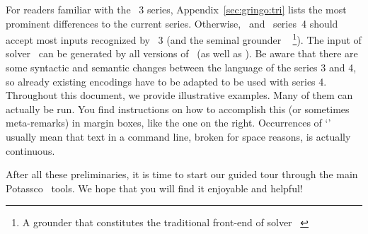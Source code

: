 For readers familiar with the \gringo~3 series, Appendix~\ref{sec:gringo:tri}
lists the most prominent differences to the current series.
Otherwise, \gringo\ and \clingo\ series~4 should accept most inputs recognized by \gringo~3 (and the seminal grounder \lparse~\cite{lparseManual}%
\footnote{A grounder that constitutes the traditional front-end of solver \smodels~\cite{siniso02a}}).
The input of solver \clasp\ can be generated by all versions of \gringo\ (as well as \lparse).
Be aware that there are some syntactic and semantic changes between the language of the series 3 and 4,
so already existing encodings have to be adapted to be used with series 4.
Throughout this document, we provide illustrative examples.
Many of them can actually be run.
You find instructions on how to accomplish this
(or sometimes meta-remarks)
in margin boxes, like the one on the right.
Occurrences of `'
usually mean that text in a command line, broken for space reasons, is actually continuous.

After all these preliminaries, it is time to start our guided tour
through the main Potassco~\cite{potassco} tools.
We hope that you will find it enjoyable and helpful!

